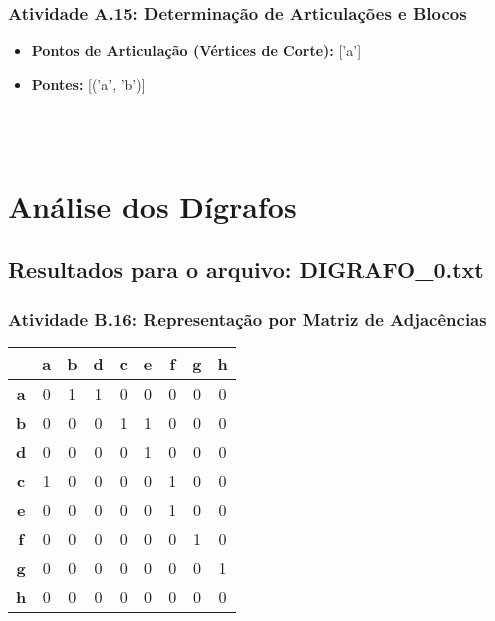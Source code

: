 \documentclass[a4paper,12pt]{article}
\begin{document}
\subsubsection*{Atividade A.15: Determinação de Articulações e Blocos}
\begin{itemize}[nosep, leftmargin=*]
    \item \textbf{Pontos de Articulação (Vértices de Corte):} ['a']
    \item \textbf{Pontes:} [('a', 'b')]
\end{itemize}

\\ \\

\section{Análise dos Dígrafos}

\subsection{Resultados para o arquivo: DIGRAFO\_0.txt}

\subsubsection*{Atividade B.16: Representação por Matriz de Adjacências}
\begin{center}
\scriptsize
\begin{tabular*}{\textwidth}{c|@{\extracolsep{\fill}}cccccccc}
\rowcolor[gray]{0.9}
  & \textbf{a} & \textbf{b} & \textbf{d} & \textbf{c} & \textbf{e} & \textbf{f} & \textbf{g} & \textbf{h} \\
\hline
\textbf{a} & 0 & 1 & 1 & 0 & 0 & 0 & 0 & 0 \\
\textbf{b} & 0 & 0 & 0 & 1 & 1 & 0 & 0 & 0 \\
\textbf{d} & 0 & 0 & 0 & 0 & 1 & 0 & 0 & 0 \\
\textbf{c} & 1 & 0 & 0 & 0 & 0 & 1 & 0 & 0 \\
\textbf{e} & 0 & 0 & 0 & 0 & 0 & 1 & 0 & 0 \\
\textbf{f} & 0 & 0 & 0 & 0 & 0 & 0 & 1 & 0 \\
\textbf{g} & 0 & 0 & 0 & 0 & 0 & 0 & 0 & 1 \\
\textbf{h} & 0 & 0 & 0 & 0 & 0 & 0 & 0 & 0 \\
\end{tabular*}
\end{center}
\end{document}
